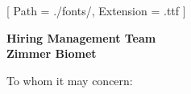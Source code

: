 


\renewcommand{\photo}[2]{}

\geometry{
  left=2cm,
  right=2cm,
  top=2cm,
  bottom=2cm
}



\makecvheader

\setmainfont{NotoSans-Regular}[
  Path = ./fonts/,
  Extension = .ttf
]

\vspace{1cm}
\indent\textbf{Hiring Management Team}\\
\indent\textbf{Zimmer Biomet}

\vspace{0.5cm}

\noindent To whom it may concern:

\vspace{0.5cm}

